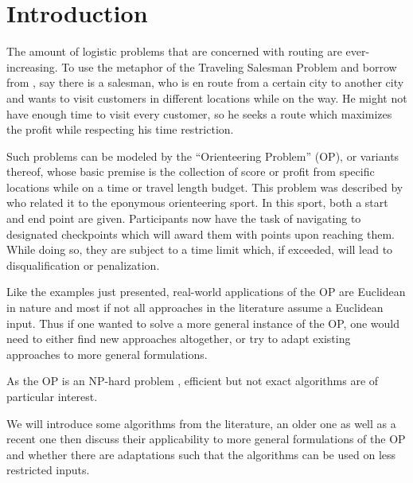 \section{Introduction}
\label{sec:01:introduction}

The amount of logistic problems that are concerned with routing are ever-increasing.
To use the metaphor of the Traveling Salesman Problem and borrow from \citeauthor{chao_fast_1996} \cite{chao_fast_1996},
say there is a salesman, who is en route from a certain city to another city and wants to visit customers in different locations while on the way.
He might not have enough time to visit every customer, so he seeks a route which maximizes the profit while respecting his time restriction.

Such problems can be modeled by the \enquote{Orienteering Problem} (OP), or variants thereof,
whose basic premise is the collection of score or profit from specific locations while on a time or travel length budget. 
This problem was described by \citeauthor{tsiligiridis_heuristic_1984} \cite{tsiligiridis_heuristic_1984} who related it to the eponymous orienteering sport.
In this sport, both a start and end point are given. Participants now have the task of navigating to designated checkpoints which will award them with points upon reaching them.
While doing so, they are subject to a time limit which, if exceeded, will lead to disqualification or penalization.

Like the examples just presented, real-world applications of the OP are Euclidean in nature and
most if not all approaches in the literature assume a Euclidean input. \cite{vansteenwegen_orienteering_2011}
Thus if one wanted to solve a more general instance of the OP, one would need to either find new approaches altogether,
or try to adapt existing approaches to more general formulations. 

As the OP is an NP-hard problem \cite{golden_orienteering_1987}, efficient but not exact algorithms are of particular interest.

We will introduce some algorithms from the literature, an older one as well as a recent one 
then discuss their applicability to more general formulations of the OP 
and whether there are adaptations such that the algorithms can be used on less restricted inputs.
